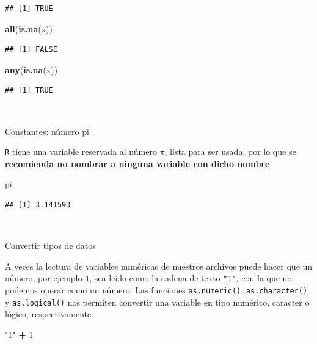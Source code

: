 \documentclass[11pt,]{book}
\newenvironment{Shaded}{\begin{snugshade}}{\end{snugshade}}
\newcommand{\DecValTok}[1]{\textcolor[rgb]{0.06,0.06,0.06}{#1}}
\newcommand{\KeywordTok}[1]{\textcolor[rgb]{0.27,0.27,0.27}{\textbf{#1}}}
\newcommand{\NormalTok}[1]{#1}
\newcommand{\OperatorTok}[1]{\textcolor[rgb]{0.43,0.43,0.43}{\textbf{#1}}}
\newcommand{\StringTok}[1]{\textcolor[rgb]{0.5,0.5,0.5}{#1}}
\begin{document}
\begin{verbatim}
## [1] TRUE
\end{verbatim}

\begin{Shaded}
\begin{Highlighting}[]
\KeywordTok{all}\NormalTok{(}\KeywordTok{is.na}\NormalTok{(x))}
\end{Highlighting}
\end{Shaded}

\begin{verbatim}
## [1] FALSE
\end{verbatim}

\begin{Shaded}
\begin{Highlighting}[]
\KeywordTok{any}\NormalTok{(}\KeywordTok{is.na}\NormalTok{(x))}
\end{Highlighting}
\end{Shaded}

\begin{verbatim}
## [1] TRUE
\end{verbatim}

~

Constantes: número pi

\texttt{R} tiene una variable reservada al número \(\pi\), lista para ser usada, por lo que se \textbf{recomienda no nombrar a ninguna variable con dicho nombre}.

\begin{Shaded}
\begin{Highlighting}[]
\NormalTok{pi}
\end{Highlighting}
\end{Shaded}

\begin{verbatim}
## [1] 3.141593
\end{verbatim}

~

Convertir tipos de datos

A veces la lectura de variables numéricas de nuestros archivos puede hacer que un número, por ejemplo \texttt{1}, sea leído como la cadena de texto \texttt{"1"}, con la que no podemos operar como un número. Las funciones \texttt{as.numeric()}, \texttt{as.character()} y \texttt{as.logical()} nos permiten convertir una variable en tipo numérico, caracter o lógico, respectivamente.

\begin{Shaded}
\begin{Highlighting}[]
\StringTok{"1"} \OperatorTok{+}\StringTok{ }\DecValTok{1}
\end{Highlighting}
\end{Shaded}
\end{document}
